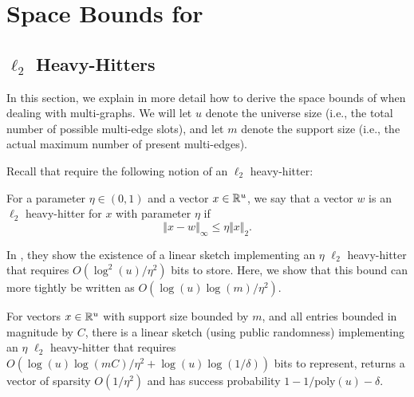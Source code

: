 \documentclass{article}
\begin{document}
\section{Space Bounds for \texorpdfstring{\cite{KLMMS14}}{KLMMS14}}\label{sec:linearSketchingAppendix}

\subsection{\texorpdfstring{$\ell_2$}{l2} Heavy-Hitters}

In this section, we explain in more detail how to derive the space bounds of \cite{KLMMS14} when dealing with multi-graphs. We will let $u$ denote the universe size (i.e., the total number of possible multi-edge slots), and let $m$ denote the support size (i.e., the actual maximum number of present multi-edges). 

Recall that \cite{KLMMS14} require the following notion of an $\ell_2$ heavy-hitter:

\begin{definition}
    For a parameter $\eta \in (0,1)$ and a vector $x \in \mathbb{R}^u$, we say that a vector $w$ is an $\ell_2$ heavy-hitter for $x$ with parameter $\eta$ if 
    \[
    \left \Vert x - w \right \Vert_{\infty} \leq \eta \Vert x \Vert_2. 
    \]
\end{definition}

In \cite{KLMMS14}, they show the existence of a linear sketch implementing an $\eta$ $\ell_2$ heavy-hitter that requires $O(\log^2(u) / \eta^2)$ bits to store. Here, we show that this bound can more tightly be written as $O(\log(u)\log(m) / \eta^2)$. 

\begin{claim}\label{clm:heavyhitter}
    For vectors $x \in \mathbb{R}^u$ with support size bounded by $m$, and all entries bounded in magnitude by $C$, there is a linear sketch (using public randomness) implementing an $\eta$ $\ell_2$ heavy-hitter that requires $O(\log(u)\log(mC) / \eta^2 + \log(u) \log(1 / \delta))$ bits to represent, returns a vector of sparsity $O(1 / \eta^2)$ and has success probability $1 - 1 / \text{poly}(u) - \delta$.
\end{claim}
\end{document}
